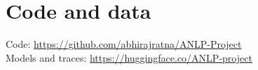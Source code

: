 \documentclass[11pt]{article}
\begin{document}










\section*{Code and data}
Code: \url{https://github.com/abhirajratna/ANLP-Project}\\
Models and traces: \url{https://huggingface.co/ANLP-project}\\



\clearpage   %
\appendix

\end{document}
